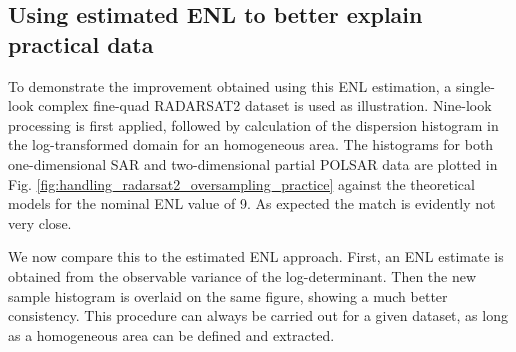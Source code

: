 \documentclass[journal]{IEEEtran}
\begin{document}
\subsection{Using estimated ENL to better explain practical data}
\label{sec:valid_improve_practice}

To demonstrate the improvement obtained using this ENL estimation, a single-look complex fine-quad RADARSAT2 dataset is used as illustration. 
Nine-look processing is first applied, followed by calculation of the dispersion histogram in the log-transformed domain for an homogeneous area.
The histograms for both one-dimensional SAR and two-dimensional partial POLSAR data are plotted in Fig. \ref{fig:handling_radarsat2_oversampling_practice}
  against the theoretical models for the nominal ENL value of 9.
As expected the match is evidently not very close.

We now compare this to the estimated ENL approach.
First, an ENL estimate is obtained from the observable variance of the log-determinant. 
Then the new sample histogram is overlaid on the same figure,
  showing a much better consistency.
This procedure can always be carried out for a given dataset,
  as long as a homogeneous area can be defined and extracted.
  
\end{document}
